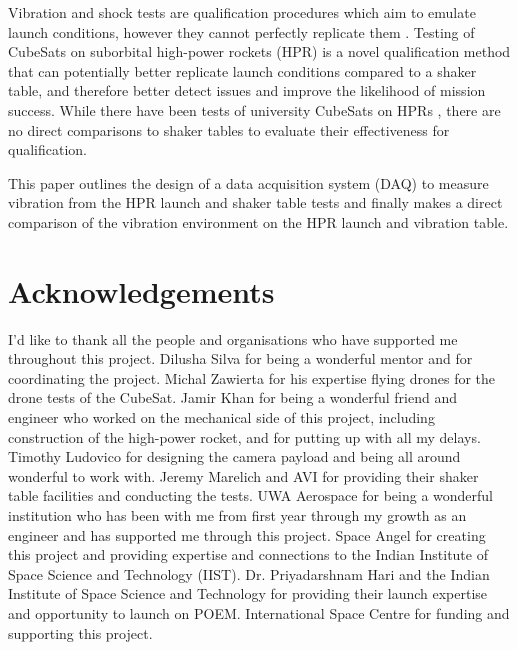 \documentclass{report}
\begin{document}
Vibration and shock tests are qualification procedures which aim to emulate launch conditions, however they cannot perfectly replicate them \cite{gordon2015benefits}. Testing of CubeSats on suborbital high-power rockets (HPR) is a novel qualification method that can potentially better replicate launch conditions compared to a shaker table, and therefore better detect issues and improve the likelihood of mission success. While there have been tests of university CubeSats on HPRs \cite{slongo2019pre}, there are no direct comparisons to shaker tables to evaluate their effectiveness for qualification.

This paper outlines the design of a data acquisition system (DAQ) to measure vibration from the HPR launch and shaker table tests and finally makes a direct comparison of the vibration environment on the HPR launch and vibration table.


\section*{Acknowledgements}

I'd like to thank all the people and organisations who have supported me throughout this project. Dilusha Silva for being a wonderful mentor and for coordinating the project. Michal Zawierta for his expertise flying drones for the drone tests of the CubeSat. Jamir Khan for being a wonderful friend and engineer who worked on the mechanical side of this project, including construction of the high-power rocket, and for putting up with all my delays. Timothy Ludovico for designing the camera payload and being all around wonderful to work with. Jeremy Marelich and AVI for providing their shaker table facilities and conducting the tests. UWA Aerospace for being a wonderful institution who has been with me from first year through my growth as an engineer and has supported me through this project. Space Angel for creating this project and providing expertise and connections to the Indian Institute of Space Science and Technology (IIST). Dr. Priyadarshnam Hari and the Indian Institute of Space Science and Technology for providing their launch expertise and opportunity to launch on POEM. International Space Centre for funding and supporting this project.

\newpage
\tableofcontents
\newpage

\renewcommand{\listfigurename}{
  \section*{List of Figures}
}
\listoffigures
\cleardoublepage
\renewcommand{\listtablename}{
  \section*{List of Tables}
}
\listoftables
\cleardoublepage
\end{document}
